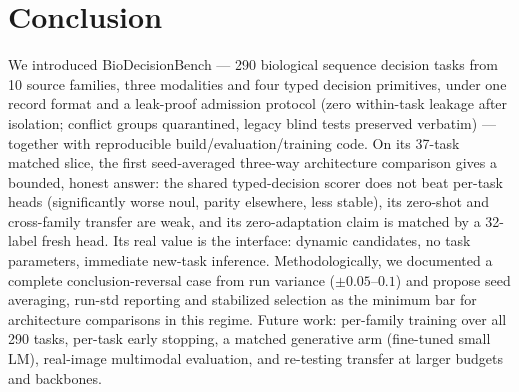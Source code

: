 \section{Conclusion}
\label{sec:conclusion}

We introduced BioDecisionBench --- 290 biological sequence decision tasks from 10 source
families, three modalities and four typed decision primitives, under one record format and
a leak-proof admission protocol (zero within-task leakage after isolation; conflict groups
quarantined, legacy blind tests preserved verbatim) --- together with reproducible
build/evaluation/training code. On its 37-task matched slice, the first seed-averaged
three-way architecture comparison gives a bounded, honest answer: the shared typed-decision
scorer does not beat per-task heads (significantly worse noul, parity elsewhere, less
stable), its zero-shot and cross-family transfer are weak, and its zero-adaptation claim is
matched by a 32-label fresh head. Its real value is the interface: dynamic candidates, no
task parameters, immediate new-task inference. Methodologically, we documented a complete
conclusion-reversal case from run variance ($\pm0.05$--$0.1$) and propose seed averaging,
run-std reporting and stabilized selection as the minimum bar for architecture comparisons
in this regime. Future work: per-family training over all 290 tasks, per-task early
stopping, a matched generative arm (fine-tuned small LM), real-image multimodal evaluation,
and re-testing transfer at larger budgets and backbones.

